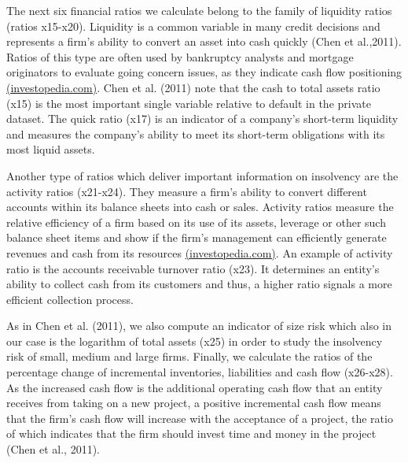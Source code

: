 \documentclass[11pt]{article}
\begin{document}
 The next six financial ratios we calculate belong to the family of liquidity ratios (ratios x15-x20). Liquidity is a common variable in many credit decisions and represents a firm's ability to convert an asset into cash quickly (Chen et al.,2011). Ratios of this type are often used by bankruptcy analysts and mortgage originators to evaluate going concern issues, as they indicate cash flow positioning \href{<https://www.investopedia.com/terms/l/liquidityratios.asp>}{(investopedia.com)}. Chen et al. (2011) note that the cash to total assets ratio (x15) is the most important single variable relative to default in the private dataset. The quick ratio (x17) is an indicator of a company's short-term liquidity and measures the company's ability to meet its short-term obligations with its most liquid assets.
 
 Another type of ratios which deliver important information on insolvency are the activity ratios (x21-x24). They measure a firm's ability to convert different accounts within its balance sheets into cash or sales. Activity ratios measure the relative efficiency of a firm based on its use of its assets, leverage or other such balance sheet items and show if the firm's management can efficiently generate revenues and cash from its resources \href{<https://www.investopedia.com/terms/a/activityratio.asp>}{(investopedia.com)}.  An example of activity ratio is the accounts receivable turnover ratio (x23). It determines an entity's ability to collect cash from its customers and thus, a higher ratio signals a more efficient collection process. 
 
 As in Chen et al. (2011), we also compute an indicator of size risk which also in our case is the logarithm of total assets (x25) in order to study the insolvency risk of small, medium and large firms. Finally, we calculate the ratios of the percentage change of incremental inventories, liabilities and cash flow (x26-x28). As the increased cash flow is the additional operating cash flow that an entity receives from taking on a new project, a positive incremental cash flow means that the firm's cash flow will increase with the acceptance of a project, the ratio of which indicates that the firm should invest time and money in the project (Chen et al., 2011). 
 
\end{document}
